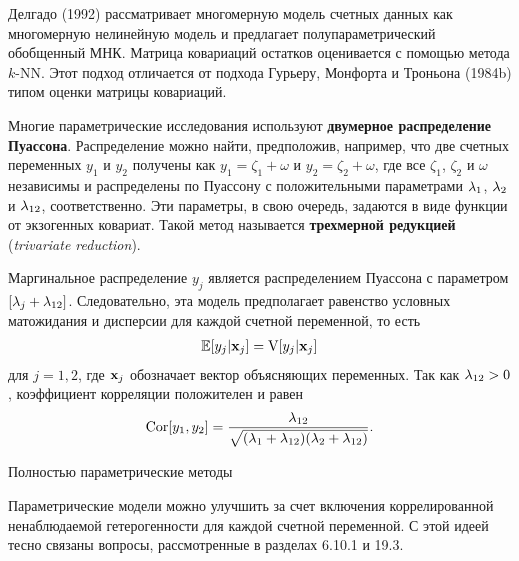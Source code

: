 Делгадо (1992) рассматривает многомерную модель счетных данных как многомерную нелинейную модель и предлагает полупараметрический обобщенный МНК. Матрица ковариаций остатков оценивается с помощью метода $k$-NN. Этот подход отличается от подхода Гурьеру, Монфорта и Троньона (1984b) типом оценки матрицы ковариаций.

Многие параметрические исследования используют \textbf{двумерное распределение Пуассона}. Распределение можно найти, предположив, например, что две счетных переменных $y_1$ и $y_2$ получены как $y_1 = \zeta_1 + \omega$ и $y_2 = \zeta_2 + \omega$, где все $\zeta_1$, $\zeta_2$ и $\omega$ независимы и распределены по Пуассону с положительными параметрами $\lambda_1$, $\lambda_2$ и $\lambda_{12}$, соответственно. Эти параметры, в свою очередь, задаются в виде функции от экзогенных ковариат. Такой метод называется \textbf{трехмерной редукцией} (\textit{trivariate reduction}).

Маргинальное распределение $y_j$ является распределением Пуассона с параметром $[\lambda_j + \lambda_{12}]$.
Следовательно, эта модель предполагает равенство условных матожидания и дисперсии для каждой счетной переменной, то есть
    \begin{align}\label{eq:20.21}
    \mathbb{E}[y_j|\mathbf{x}_j] = \mathrm{V}[y_j|\mathbf{x}_j]
    \end{align}
для $j = 1, 2$, где $\mathbf{x}_j$ обозначает вектор объясняющих переменных. Так как $\lambda_{12} > 0$, коэффициент корреляции положителен и равен
    \begin{align}\label{eq:20.22}
    \mathrm{Cor}[y_1, y_2] = \frac{\lambda_{12}}{\sqrt{(\lambda_1 + \lambda_{12})(\lambda_2 + \lambda_{12})}}.
    \end{align}


        \begin{center}{Полностью параметрические методы}\end{center}
        \noindent
Параметрические модели можно улучшить за счет включения коррелированной ненаблюдаемой гетерогенности для каждой счетной переменной. С этой идеей тесно связаны вопросы, рассмотренные в разделах 6.10.1 и 19.3.

